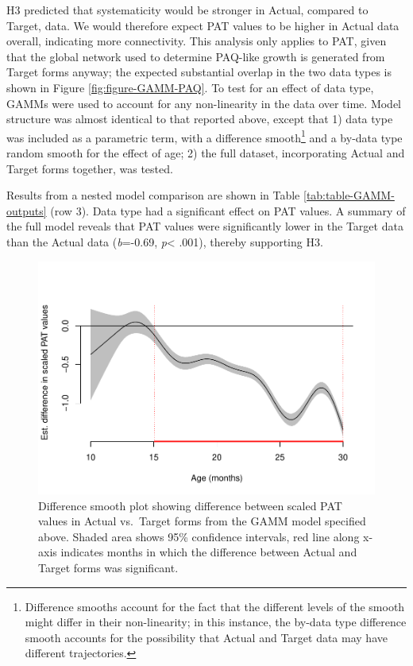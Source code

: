 \documentclass[
  man,mask,floatsintext]{apa6}
\begin{document}
H3 predicted that systematicity would be stronger in Actual, compared to Target, data. We would therefore expect PAT values to be higher in Actual data overall, indicating more connectivity. This analysis only applies to PAT, given that the global network used to determine PAQ-like growth is generated from Target forms anyway; the expected substantial overlap in the two data types is shown in Figure \ref{fig:figure-GAMM-PAQ}. To test for an effect of data type, GAMMs were used to account for any non-linearity in the data over time. Model structure was almost identical to that reported above, except that 1) data type was included as a parametric term, with a difference smooth\footnote{Difference smooths account for the fact that the different levels of the smooth might differ in their non-linearity; in this instance, the by-data type difference smooth accounts for the possibility that Actual and Target data may have different trajectories.} and a by-data type random smooth for the effect of age; 2) the full dataset, incorporating Actual and Target forms together, was tested.

Results from a nested model comparison are shown in Table \ref{tab:table-GAMM-outputs} (row 3). Data type had a significant effect on PAT values. A summary of the full model reveals that PAT values were significantly lower in the Target data than the Actual data (\emph{b}=-0.69, \emph{p}\textless{} .001), thereby supporting H3.

\begin{figure}
\centering
\includegraphics{PhonNetworksProj-anon_files/figure-latex/difference-smooth-data-type-1.pdf}
\caption{\label{fig:difference-smooth-data-type}Difference smooth plot showing difference between scaled PAT values in Actual vs.~Target forms from the GAMM model specified above. Shaded area shows 95\% confidence intervals, red line along x-axis indicates months in which
the difference between Actual and Target forms was significant.}
\end{figure}
\end{document}
